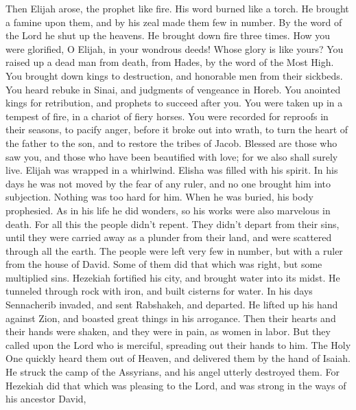  Then Elijah arose, the prophet like fire. His word burned
like a torch.  He brought a famine upon them, and by his
zeal made them few in number.  By the word of the Lord he
shut up the heavens. He brought down fire three times. 
How you were glorified, O Elijah, in your wondrous deeds! Whose glory is
like yours?  You raised up a dead man from death, from
Hades, by the word of the Most High.  You brought down
kings to destruction, and honorable men from their sickbeds.
 You heard rebuke in Sinai, and judgments of vengeance in
Horeb.  You anointed kings for retribution, and prophets
to succeed after you.  You were taken up in a tempest of
fire, in a chariot of fiery horses.  You were recorded
for reproofs in their seasons, to pacify anger, before it broke out into
wrath, to turn the heart of the father to the son, and to restore the
tribes of Jacob.  Blessed are those who saw you, and
those who have been beautified with love; for we also shall surely live.
 Elijah was wrapped in a whirlwind. Elisha was filled
with his spirit. In his days he was not moved by the fear of any ruler,
and no one brought him into subjection.  Nothing was too
hard for him. When he was buried, his body prophesied. 
As in his life he did wonders, so his works were also marvelous in
death.  For all this the people didn't repent. They
didn't depart from their sins, until they were carried away as a plunder
from their land, and were scattered through all the earth. The people
were left very few in number, but with a ruler from the house of David.
 Some of them did that which was right, but some
multiplied sins.  Hezekiah fortified his city, and
brought water into its midst. He tunneled through rock with iron, and
built cisterns for water.  In his days Sennacherib
invaded, and sent Rabshakeh, and departed. He lifted up his hand against
Zion, and boasted great things in his arrogance.  Then
their hearts and their hands were shaken, and they were in pain, as
women in labor.  But they called upon the Lord who is
merciful, spreading out their hands to him. The Holy One quickly heard
them out of Heaven, and delivered them by the hand of Isaiah.
 He struck the camp of the Assyrians, and his angel
utterly destroyed them.  For Hezekiah did that which was
pleasing to the Lord, and was strong in the ways of his ancestor David,
